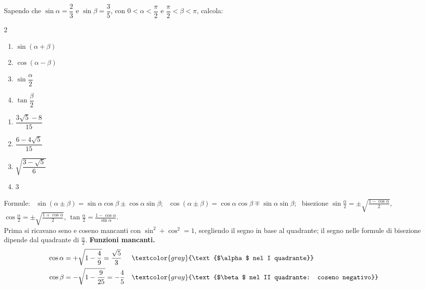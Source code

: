 
\begin{question}[ID=1.1, subtitle={Formule di addizione con $\sin\alpha=2/3$ e $\sin\beta=3/5$}, tags={goniometria, formule di addizione}, difficulty=media]
Sapendo che $\sin \alpha = \dfrac{2}{3}$ e $\sin \beta = \dfrac{3}{5}$, con $0 < \alpha < \dfrac{\pi}{2}$ e $\dfrac{\pi}{2} < \beta < \pi$, calcola:
\begin{multicols}{2}
\begin{enumerate}
\item $\sin(\alpha + \beta)$
\item $\cos(\alpha - \beta)$
\item $\sin\dfrac{\alpha}{2}$
\item $\tan\dfrac{\beta}{2}$
\end{enumerate}
\end{multicols}
\begin{solution}
\begin{enumerate}
    \item $\dfrac{3\sqrt5-8}{15}$
    \item $\dfrac{6-4\sqrt5}{15}$
    \item $\sqrt{\dfrac{3-\sqrt5}{6}}$
    \item $3$
\end{enumerate}
\end{solution}
\begin{explanation}
Formule: \ $\sin(\alpha\pm\beta)=\sin\alpha\cos\beta\pm\cos\alpha\sin\beta$; \ $\cos(\alpha\pm\beta)=\cos\alpha\cos\beta\mp\sin\alpha\sin\beta$; \ bisezione $\sin\tfrac\alpha2=\pm\sqrt{\tfrac{1-\cos\alpha}{2}}$, $\cos\tfrac\alpha2=\pm\sqrt{\tfrac{1+\cos\alpha}{2}}$, $\tan\tfrac\alpha2=\tfrac{1-\cos\alpha}{\sin\alpha}$. \\
Prima si ricavano seno e coseno mancanti con $\sin^2+\cos^2=1$, scegliendo il segno in base al quadrante; il segno nelle formule di bisezione dipende dal quadrante di $\tfrac\alpha2$.
\textbf{Funzioni mancanti.}
\[\begin{aligned}
\cos\alpha &= +\sqrt{1-\dfrac49}=\dfrac{\sqrt5}{3} && \textcolor{gray}{\text{$\alpha$ nel I quadrante}}\\
\cos\beta &= -\sqrt{1-\dfrac{9}{25}}=-\dfrac45 && \textcolor{gray}{\text{$\beta$ nel II quadrante: coseno negativo}}
\end{aligned}\]
\begin{enumerate}

\end{enumerate}
\end{explanation}
\end{question}
